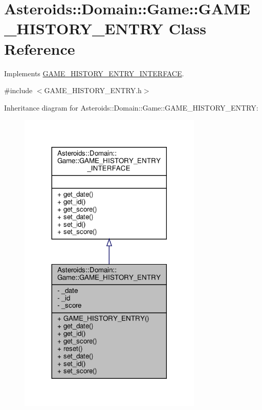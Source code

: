 \hypertarget{classAsteroids_1_1Domain_1_1Game_1_1GAME__HISTORY__ENTRY}{}\section{Asteroids\+:\+:Domain\+:\+:Game\+:\+:G\+A\+M\+E\+\_\+\+H\+I\+S\+T\+O\+R\+Y\+\_\+\+E\+N\+T\+RY Class Reference}
\label{classAsteroids_1_1Domain_1_1Game_1_1GAME__HISTORY__ENTRY}


Implements \hyperlink{classAsteroids_1_1Domain_1_1Game_1_1GAME__HISTORY__ENTRY__INTERFACE}{G\+A\+M\+E\+\_\+\+H\+I\+S\+T\+O\+R\+Y\+\_\+\+E\+N\+T\+R\+Y\+\_\+\+I\+N\+T\+E\+R\+F\+A\+CE}.  




{\ttfamily \#include $<$G\+A\+M\+E\+\_\+\+H\+I\+S\+T\+O\+R\+Y\+\_\+\+E\+N\+T\+R\+Y.\+h$>$}



Inheritance diagram for Asteroids\+:\+:Domain\+:\+:Game\+:\+:G\+A\+M\+E\+\_\+\+H\+I\+S\+T\+O\+R\+Y\+\_\+\+E\+N\+T\+RY\+:\nopagebreak
\begin{figure}[H]
\begin{center}
\leavevmode
\includegraphics[width=248pt]{classAsteroids_1_1Domain_1_1Game_1_1GAME__HISTORY__ENTRY__inherit__graph}
\end{center}
\end{figure}


